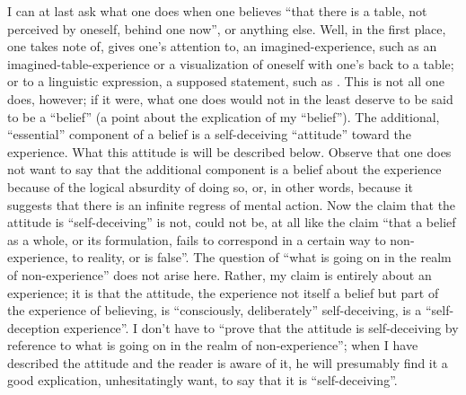 I can at last ask what one does when one believes \enquote{that there is a table, 
not perceived by oneself, behind one now}, or anything else. Well, in the 
first place, one takes note of, gives one's attention to, an 
imagined-experience, such as an imagined-table-experience or a visualization 
of oneself with one's back to a table; or to a linguistic expression, a supposed 
statement, such as . This is not all one does, 
however; if it were, what one does would not in the least deserve to be said 
to be a \enquote{belief} (a point about the explication of my \enquote{belief}). The 
additional, \enquote{essential} component of a belief is a self-deceiving \enquote{attitude} 
toward the experience. What this attitude is will be described below. Observe 
that one does not want to say that the additional component is a belief 
about the experience because of the logical absurdity of doing so, or, in 
other words, because it suggests that there is an infinite regress of mental 
action. Now the claim that the attitude is \enquote{self-deceiving} is not, could not 
be, at all like the claim \enquote{that a belief as a whole, or its formulation, fails to 
correspond in a certain way to non-experience, to reality, or is false}. The 
question of \enquote{what is going on in the realm of non-experience} does not arise 
here. Rather, my claim is entirely about an experience; it is that the attitude, 
the experience not itself a belief but part of the experience of believing, is 
\enquote{consciously, deliberately} self-deceiving, is a \enquote{self-deception experience}. I 
don't have to \enquote{prove that the attitude is self-deceiving by reference to what 
is going on in the realm of non-experience}; when I have described the 
attitude and the reader is aware of it, he will presumably find it a good 
explication, unhesitatingly want, to say that it is \enquote{self-deceiving}. 

